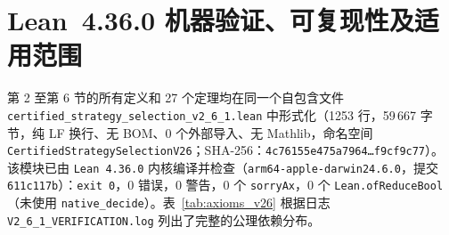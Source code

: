 \documentclass[11pt,a4paper]{article}
\theoremstyle{cleanthm}
\theoremstyle{cleandef}
\begin{document}
\section{Lean~4.36.0 机器验证、可复现性及适用范围}

第 2 至第 6 节的所有定义和 27 个定理均在同一个自包含文件 \texttt{certified\_\allowbreak strategy\_\allowbreak selection\_\allowbreak v2\_6\_1.lean} 中形式化（1253 行，59\,667 字节，纯 LF 换行、无 BOM、0 个外部导入、无 Mathlib，命名空间 \texttt{CertifiedStrategySelectionV26}；SHA-256：\texttt{4c76155e475a7964\ldots{}f9cf9c77}）。该模块已由 \texttt{Lean 4.36.0} 内核编译并检查（\texttt{arm64-apple-darwin24.6.0}，提交 \texttt{611c117b}）：\texttt{exit 0}，0 错误，0 警告，0 个 \texttt{sorryAx}，0 个 \texttt{Lean.ofReduceBool}（未使用 \texttt{native\_decide}）。表~\ref{tab:axioms_v26} 根据日志 \texttt{V2\_6\_1\_VERIFICATION.log} 列出了完整的公理依赖分布。
\end{document}
